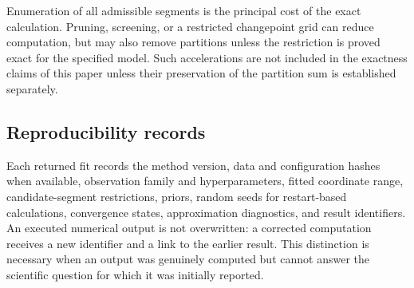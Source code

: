 Enumeration of all admissible segments is the principal cost of the exact calculation. Pruning, screening, or a restricted changepoint grid can reduce computation, but may also remove partitions unless the restriction is proved exact for the specified model. Such accelerations are not included in the exactness claims of this paper unless their preservation of the partition sum is established separately.

\subsection{Reproducibility records}
Each returned fit records the method version, data and configuration hashes when available, observation family and hyperparameters, fitted coordinate range, candidate-segment restrictions, priors, random seeds for restart-based calculations, convergence states, approximation diagnostics, and result identifiers. An executed numerical output is not overwritten: a corrected computation receives a new identifier and a link to the earlier result. This distinction is necessary when an output was genuinely computed but cannot answer the scientific question for which it was initially reported.
